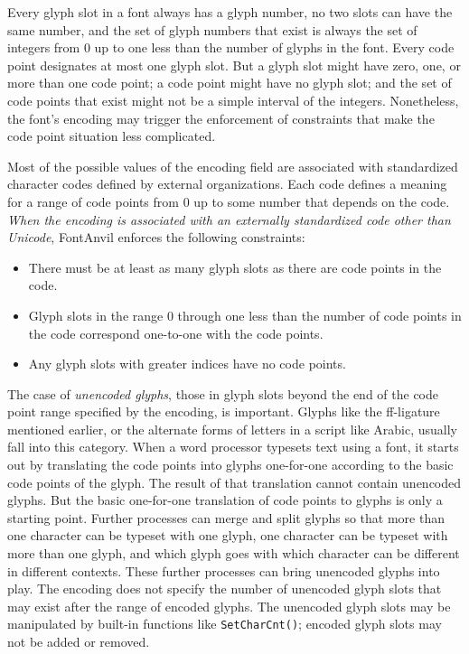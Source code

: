 \begin{framed}
Every glyph slot in a font always has a glyph number, no two slots can have
the same number, and the set of glyph numbers that exist is always the set
of integers from 0 up to one less than the number of glyphs in the font. 
Every code point designates at most one glyph slot.  But a glyph slot might
have zero, one, or more than one code point; a code point might have no
glyph slot; and the set of code points that exist might not be a simple
interval of the integers.  Nonetheless, the font's encoding may trigger the
enforcement of constraints that make the code point situation less
complicated.
\end{framed}

Most of the possible values of the encoding field are associated with
standardized character codes defined by external organizations.  Each code
defines a meaning for a range of code points from 0 up to some number that
depends on the code.  \emph{When the encoding is associated with an
externally standardized code other than Unicode}, FontAnvil enforces the
following constraints:
\begin{itemize}
\item There must be at least as many glyph slots as there are code points in
the code.
\item Glyph slots in the range 0 through one less than the number of code
points in the code correspond one-to-one with the code points.
\item Any glyph slots with greater indices have no code points.
\end{itemize}

The case of \emph{unencoded glyphs}, those in glyph slots beyond the end of
the code point range specified by the encoding, is important.  Glyphs like
the ff-ligature mentioned earlier, or the alternate forms of letters in a
script like Arabic, usually fall into this category.  When a word processor
typesets text using a font, it starts out by translating the code points
into glyphs one-for-one according to the basic code points of the glyph. 
The result of that translation cannot contain unencoded glyphs.  But the
basic one-for-one translation of code points to glyphs is only a starting
point.  Further processes can merge and split glyphs so that more than one
character can be typeset with one glyph, one character can be typeset with
more than one glyph, and which glyph goes with which character can be
different in different contexts.  These further processes can bring
unencoded glyphs into play.  The encoding does not specify the number of
unencoded glyph slots that may exist after the range of encoded glyphs.  The
unencoded glyph slots may be manipulated by built-in functions like
\texttt{SetCharCnt()}; encoded glyph slots may not be added or removed.

